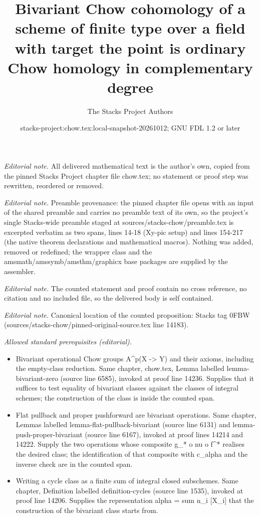 \documentclass[10pt,a4paper]{amsart}
\title{Bivariant Chow cohomology of a scheme of finite type over a field with target the point is ordinary Chow homology in complementary degree}
\author{The Stacks Project Authors}
\date{stacks-project:chow.tex:local-snapshot-20261012; GNU FDL 1.2 or later}
\theoremstyle{plain}
\theoremstyle{definition}
\theoremstyle{remark}
\numberwithin{equation}{subsection}
\begin{document}
\maketitle
\noindent\textit{Editorial note.} All delivered mathematical text is the author's own, copied from the pinned Stacks Project chapter file chow.tex; no statement or proof step was rewritten, reordered or removed.\par\medskip
\noindent\textit{Editorial note.} Preamble provenance: the pinned chapter file opens with an input of the shared preamble and carries no preamble text of its own, so the project's single Stacks-wide preamble staged at sources/stacks-chow/preamble.tex is excerpted verbatim as two spans, lines 14-18 (Xy-pic setup) and lines 154-217 (the native theorem declarations and mathematical macros). Nothing was added, removed or redefined; the wrapper class and the amsmath/amssymb/amsthm/graphicx base packages are supplied by the assembler.\par\medskip
\noindent\textit{Editorial note.} The counted statement and proof contain no cross reference, no citation and no included file, so the delivered body is self contained.\par\medskip
\noindent\textit{Editorial note.} Canonical location of the counted proposition: Stacks tag 0FBW (sources/stacks-chow/pinned-original-source.tex line 14183).\par\medskip
\noindent\textit{Allowed standard prerequisites (editorial).}\begin{itemize}
\item Bivariant operational Chow groups A\textasciicircum{}p(X -> Y) and their axioms, including the empty-class reduction. Same chapter, chow.tex, Lemma labelled lemma-bivariant-zero (source line 6585), invoked at proof line 14236. Supplies that it suffices to test equality of bivariant classes against the classes of integral schemes; the construction of the class is inside the counted span.
\item Flat pullback and proper pushforward are bivariant operations. Same chapter, Lemmas labelled lemma-flat-pullback-bivariant (source line 6131) and lemma-push-proper-bivariant (source line 6167), invoked at proof lines 14214 and 14222. Supply the two operations whose composite g\_* o nu o f\textasciicircum{}* realises the desired class; the identification of that composite with c\_alpha and the inverse check are in the counted span.
\item Writing a cycle class as a finite sum of integral closed subschemes. Same chapter, Definition labelled definition-cycles (source line 1535), invoked at proof line 14206. Supplies the representation alpha = sum n\_i [X\_i] that the construction of the bivariant class starts from.
\end{itemize}\medskip
\end{document}
